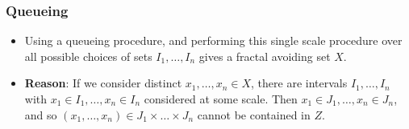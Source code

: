 \documentclass[usenames,dvipsnames]{beamer}
\begin{document}
\begin{frame}
    \frametitle{Queueing}

    \begin{itemize}
        \item Using a queueing procedure, and performing this single scale procedure over all possible choices of sets $I_1, \dots, I_n$ gives a fractal avoiding set $X$.

        \item {\bf Reason}: If we consider distinct $x_1, \dots, x_n \in X$, there are intervals $I_1, \dots, I_n$ with $x_1 \in I_1, \dots, x_n \in I_n$ considered at some scale. Then $x_1 \in J_1, \dots, x_n \in J_n$, and so $(x_1, \dots, x_n) \in J_1 \times \dots \times J_n$ cannot be contained in $Z$.
    \end{itemize}
\end{frame}
\end{document}
